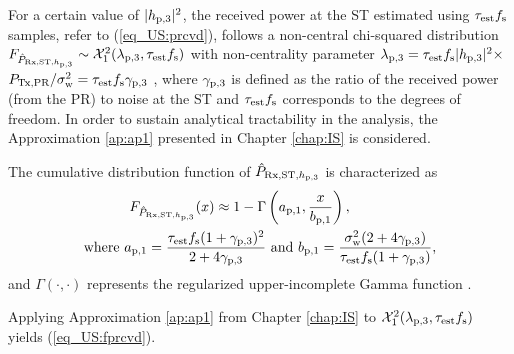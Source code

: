 For a certain value of $|h_{\text{p,3}}|^2$, the received power at the ST estimated using $\tau_{\text{est}} f_{\text{s}}$ samples, refer to (\ref{eq_US:prcvd}), follows a non-central chi-squared distribution $\fprcvdstpr \sim \ncchi2(\lpth, \test \fsam)$ with non-centrality parameter $\lambda_{\text{p,3}} = \tau_{\text{est}} f_{\text{s}} |h_{\text{p,3}}|^2 \times$ $P_{\text{Tx,PR}} /\sigma^2_{\text{w}} = \tau_{\text{est}} f_{\text{s}} {\gamma}_{\text{p,3}}$ \cite{Kay}, where ${\gamma}_{\text{p,3}}$ is defined as the ratio of the received power (from the PR) to noise at the ST and $\tau_{\text{est}} f_{\text{s}}$ corresponds to the degrees of freedom. In order to sustain analytical tractability in the analysis, the Approximation \ref{ap:ap1} presented in Chapter \ref{chap:IS} is considered. 
\begin{lemma} \label{lm_US:lm1}
\normalfont
The cumulative distribution function of $\hat{P}_{\text{Rx,ST,$h_{\text{p,3}}$}}$ is characterized as 
\begin{align}
F_{\hat{P}_{\text{Rx,ST,$h_{\text{p,3}}$}}}(x) \approx 1 - \Gamma&\left(a_{\text{p,1}}, \frac{x}{b_{\text{p,1}}}\right) \label{eq_US:fprcvd}, \\ 
\text{where  } a_{\text{p,1}} = \frac{\tau_{\text{est}} f_{\text{s}} (1 + {\gamma}_{\text{p,3}})^2}{2 + 4 {\gamma}_{\text{p,3}}} &\text{ and } b_{\text{p,1}} = \frac{\sigma^2_{\text{w}} (2 + 4 {\gamma}_{\text{p,3}})}{\tau_{\text{est}} f_{\text{s}} (1 + {\gamma}_{\text{p,3}})},  \label{eq_US:para_po} 
\end{align} 
and $\Gamma(\cdot, \cdot)$ represents the regularized upper-incomplete Gamma function \cite{abramo}. 
\end{lemma}
\begin{IEEEproof}
Applying Approximation \ref{ap:ap1} from Chapter \ref{chap:IS} to $\ncchi2(\lpth, \test \fsam)$ yields (\ref{eq_US:fprcvd}). 
\end{IEEEproof}

